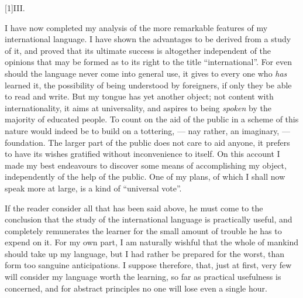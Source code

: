 \documentclass[12pt,twoside]{book}
\begin{document}
\hspace*{\fill}\scalebox{2}[1]{\large\cowboyfont{}III.}\hspace*{\fill}

\vspace{12pt}
\nopagebreak
I have now completed my analysis of the more remarkable features of my international language. I have shown the advantages to be derived from a study of it, and proved that its ultimate success is altogether independent of the opinions that may be formed as to its right to the title “international”. For even should the language never come into general use, it gives to every one who \emph{has} learned it, the possibility of being understood by foreigners, if only they be able to read and write. But my tongue has yet another object; not content with internationality, it aims at universality, and aspires to being \emph{spoken} by the majority of educated people. To count on the aid of the public in a scheme of this nature would indeed be to build on a tottering, --- nay rather, an imaginary, --- foundation. The larger part of the public does not care to aid anyone, it prefers to have its wishes gratified without inconvenience to itself. On this account I made my best endeavours to discover some means of accomplishing my object, independently of the help of the public. One of my plans, of which I shall now speak more at large, is a kind of “universal vote”.

If the reader consider all that has been said above, he must come to the conclusion that the study of the international language is practically useful, and completely remunerates the learner for the small amount of trouble he has to expend on it. For my own part, I am naturally wishful that the whole of mankind should take up my language, but I had rather be prepared for the worst, than form too sanguine anticipations. I suppose therefore, that, just at first, very few will consider my language worth the learning, so far as practical usefulness is concerned, and for abstract principles no one will lose even a single hour.
\end{document}
